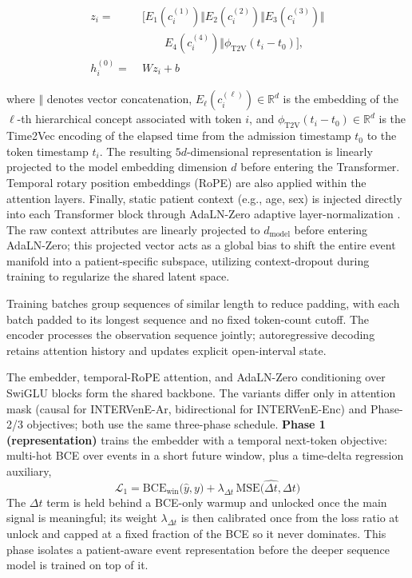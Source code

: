 \documentclass[letterpaper]{article} %
\begin{document}
\begin{equation}
\begin{aligned}
z_i =\;&
\Big[
E_1(c_i^{(1)}) \Vert
E_2(c_i^{(2)}) \Vert
E_3(c_i^{(3)}) \Vert\\
&\qquad E_4(c_i^{(4)}) \Vert
\phi_{\mathrm{T2V}}(t_i-t_0)
\Big],\\
h_i^{(0)} =\;& W z_i + b
\end{aligned}
\end{equation}

where $\Vert$ denotes vector concatenation, $E_\ell(c_i^{(\ell)}) \in \mathbb{R}^{d}$ is the embedding of the $\ell$-th hierarchical concept associated with token $i$, and $\phi_{\mathrm{T2V}}(t_i-t_0) \in \mathbb{R}^{d}$ is the Time2Vec encoding of the elapsed time from the admission timestamp $t_0$ to the token timestamp $t_i$. The resulting $5d$-dimensional representation is linearly projected to the model embedding dimension $d$ before entering the Transformer. Temporal rotary position embeddings (RoPE) \citep{su2024roformer} are also applied within the attention layers. Finally, static patient context (e.g., age, sex) is injected directly into each Transformer block through AdaLN-Zero adaptive layer-normalization \citep{peebles2023adaln0}. The raw context attributes are linearly projected to $d_\text{model}$ before entering AdaLN-Zero; this projected vector acts as a global bias to shift the entire event manifold into a patient-specific subspace, utilizing context-dropout during training to regularize the shared latent space.

Training batches group sequences of similar length to reduce padding, with each batch padded to its longest sequence and no fixed token-count cutoff. The encoder processes the observation sequence jointly; autoregressive decoding retains attention history and updates explicit open-interval state.

The embedder, temporal-RoPE attention, and AdaLN-Zero conditioning over SwiGLU blocks form the shared backbone. The variants differ only in attention mask (causal for INTERVenE-Ar, bidirectional for INTERVenE-Enc) and Phase-2/3 objectives; both use the same three-phase schedule. \textbf{Phase 1 (representation)} trains the embedder with a temporal next-token objective: multi-hot BCE over events in a short future window, plus a time-delta regression auxiliary,
\begin{equation}
\mathcal{L}_1 = \mathrm{BCE}_{\text{win}}\big(\hat{y}, y\big) + \lambda_{\Delta t}\,\mathrm{MSE}\big(\widehat{\Delta t}, \Delta t\big)
\end{equation}
The $\Delta t$ term is held behind a BCE-only warmup and unlocked once the main signal is meaningful; its weight $\lambda_{\Delta t}$ is then calibrated once from the loss ratio at unlock and capped at a fixed fraction of the BCE so it never dominates. This phase isolates a patient-aware event representation before the deeper sequence model is trained on top of it.
\end{document}

